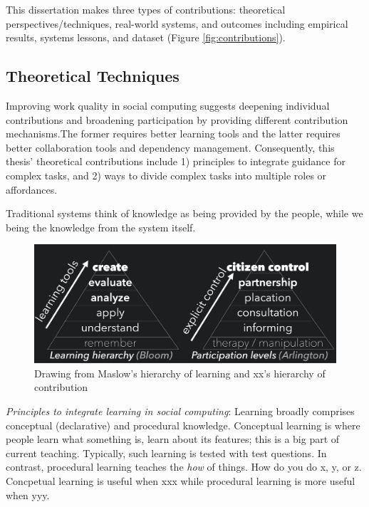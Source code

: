 This dissertation makes three types of contributions: theoretical perspectives/techniques, real-world systems, and outcomes including empirical results, systems lessons, and dataset (Figure \ref{fig:contributions}). 

\subsection{Theoretical  Techniques}
Improving  work quality in social computing suggests deepening individual contributions and broadening participation by providing different contribution mechanisms.The former requires better learning tools and the latter requires better collaboration tools and dependency management. Consequently, this thesis' theoretical contributions include 1) principles to integrate guidance for complex tasks, and 2) ways to divide complex tasks into multiple roles or affordances.


Traditional systems think of knowledge as being provided by the people, while we being the knowledge from the system itself.

\begin{figure}[b] 
  \centering
 \includegraphics[width=1.0\textwidth]{figures/intro/intro-taxonomy}
  \caption[Drawing from Maslow's hierarchy of learning and  hierarchy of contribution]
{Drawing from Maslow's hierarchy of learning and xx's hierarchy of contribution}
  \label{fig:intro-taxonomy}
\end{figure}

\textit{Principles to integrate learning in social computing}: Learning broadly comprises conceptual (declarative) and procedural knowledge. Conceptual learning is where people learn what something is, learn about its features; this is a big part of current teaching. Typically, such learning is tested with test questions. In contrast, procedural learning teaches the {\it how} of things. How do you do x, y, or z.  Concpetual learning is useful when xxx while procedural learning is more useful when yyy.

